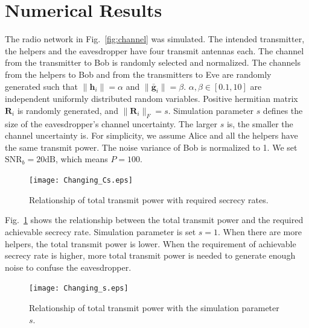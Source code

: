 \documentclass[journal]{IEEEtran}
\begin{document}
\section{Numerical Results} \label{sec:numerical results}
The radio network in Fig.~\ref{fig:channel} was simulated. The intended transmitter, the helpers and the eavesdropper have four transmit antennas each. The channel from the transmitter to Bob is randomly selected and normalized. The channels from the helpers to Bob and from the transmitters to Eve are randomly generated such that $\|\mathbf{h}_i\| = \alpha$ and $\|\bar{\mathbf{g}}_i\| = \beta$. $\alpha,\beta\in  [0.1,10]$ are independent uniformly distributed random variables.
Positive hermitian matrix $\mathbf{R}_i$ is randomly generated, and $\|\mathbf{R}_i\|_F = s$. Simulation parameter $s$ defines the size of the eavesdropper's channel uncertainty. The larger $s$ is, the smaller the channel uncertainty is. 
For simplicity, we assume Alice and all the helpers have the same transmit power. 
The noise variance of Bob is normalized to 1. We set $\mathrm{SNR}_b = 20 \mathrm{dB}$, which means $P = 100$.


\begin{figure}[!ht]
	\centering
	\texttt{[image: Changing\_Cs.eps]} %
	\caption{Relationship of total transmit power with required secrecy rates.}
	\label{fig:Changing_Cs}
\end{figure}

Fig.~\ref{fig:Changing_Cs} shows the relationship between the total transmit power and the required achievable secrecy rate. Simulation parameter is set $s = 1$. When there are more helpers, the total transmit power is lower. 
When the requirement of achievable secrecy rate is higher, more total transmit power is needed to generate enough noise to confuse the eavesdropper. %

\begin{figure}[!ht]
	\centering
	\texttt{[image: Changing\_s.eps]} %
	\caption{Relationship of total transmit power with the simulation parameter $s$.}
	\label{fig:Changing_s}
\end{figure}
\end{document}
